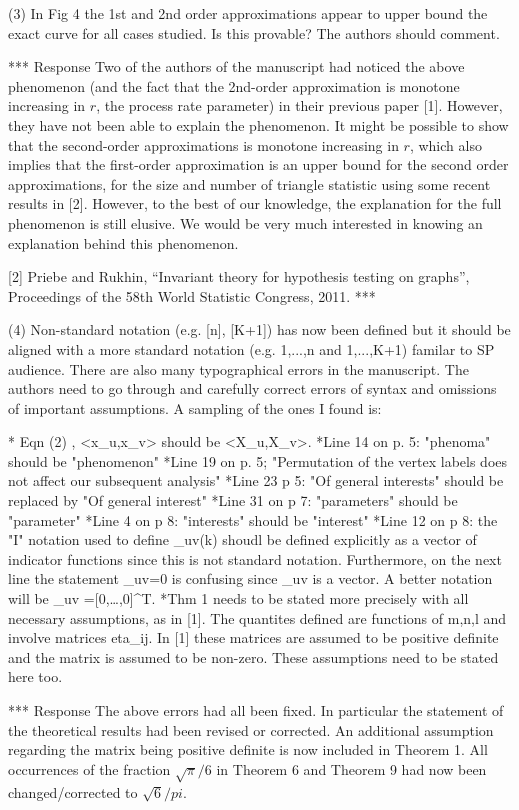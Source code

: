 (3) In Fig 4 the 1st and 2nd order approximations appear to upper bound
the exact curve for all cases studied.  Is this provable? The authors
should comment. 

*** Response
Two of the authors of the manuscript had noticed the above
phenomenon (and the fact that the 2nd-order approximation is monotone
increasing in $r$, the process rate parameter) in their previous paper
[1]. However, they have not been able to explain the phenomenon. It
might be possible to show that the
second-order approximations is monotone increasing in $r$, which also implies
that the first-order approximation is an upper bound for the second order
approximations, for the size and number of triangle statistic using some
recent results in [2]. However, to the best of our knowledge,
the explanation for the full phenomenon is still elusive. We would be
very much interested in knowing an explanation behind this phenomenon.

[2] Priebe and Rukhin, ``Invariant theory for hypothesis testing on
graphs'', Proceedings of the 58th World Statistic Congress, 2011. 
***

(4) Non-standard notation (e.g. [n], [K+1]) has now been defined but
it should be aligned with a more standard notation (e.g. {1,...,n} and
{1,...,K+1}) familar to SP audience. There are also many typographical
errors in the manuscript. The authors need to go through and carefully
correct errors of syntax and omissions of important assumptions. A
sampling of the ones I found is:

* Eqn (2) , <x_u,x_v> should be <X_u,X_v>.
*Line 14 on p. 5: "phenoma" should be "phenomenon"
*Line 19 on p. 5; "Permutation of the vertex labels does not affect
our subsequent analysis"
*Line 23 p 5: "Of general interests" should be replaced by "Of general interest"
*Line 31 on p 7: "parameters" should be "parameter"
*Line 4 on p 8: "interests" should be "interest"
*Line 12 on p 8: the "I" notation used to define \Gamma_{uv}(k) shoudl
be defined explicitly as a vector of indicator functions since this is
not standard notation. Furthermore, on the next line the statement
\Gamma_{uv}=0 is confusing since \Gamma_{uv} is a vector. A better
notation will be \Gamma_{uv} =[0,\ldots,0]^T.
*Thm 1 needs to be stated more precisely with all necessary
assumptions, as in [1]. The quantites defined are functions of m,n,l
and involve matrices eta_{ij}. In [1] these matrices are assumed to be
positive definite and the matrix \zeta is assumed to be
non-zero. These assumptions need to be stated here too.

*** Response
The above errors had all been fixed. In particular the statement of
the theoretical results had been revised or corrected. An additional
assumption regarding the matrix \zeta being positive definite is now
included in Theorem 1. All occurrences of the fraction $\sqrt{\pi}/6$ in Theorem 6 and
Theorem 9 had now been changed/corrected to $\sqrt{6}/pi$. 

